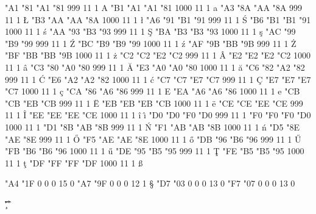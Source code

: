 \setcharcode  "A1  "81  "A1  "81   999  11  1  \texaccent \og A
\setcharcode  "B1  "A1  "A1  "81  1000  11  1  \texaccent \og a
\setcharcode  "A3  "8A  "AA  "8A   999  11  1  \texmacro  \L
\setcharcode  "B3  "AA  "AA  "8A  1000  11  1  \texmacro  \l
\setcharcode  "A6  "91  "B1  "91   999  11  1  \texaccent \'S
\setcharcode  "B6  "B1  "B1  "91  1000  11  1  \texaccent \'s
\setcharcode  "AA  "93  "B3  "93   999  11  1  \texaccent \c S
\setcharcode  "BA  "B3  "B3  "93  1000  11  1  \texaccent \c s
\setcharcode  "AC  "99  "B9  "99   999  11  1  \texaccent \'Z
\setcharcode  "BC  "B9  "B9  "99  1000  11  1  \texaccent \'z
\setcharcode  "AF  "9B  "BB  "9B   999  11  1  \texaccent \.Z
\setcharcode  "BF  "BB  "BB  "9B  1000  11  1  \texaccent \.z
\setcharcode  "C2  "C2  "E2  "C2   999  11  1  \texaccent \^A
\setcharcode  "E2  "E2  "E2  "C2  1000  11  1  \texaccent \^a
\setcharcode  "C3  "80  "A0  "80   999  11  1  \texaccent \u A
\setcharcode  "E3  "A0  "A0  "80  1000  11  1  \texaccent \u a
\setcharcode  "C6  "82  "A2  "82   999  11  1  \texaccent \'C
\setcharcode  "E6  "A2  "A2  "82  1000  11  1  \texaccent \'c
\setcharcode  "C7  "C7  "E7  "C7   999  11  1  \texaccent \c C
\setcharcode  "E7  "E7  "E7  "C7  1000  11  1  \texaccent \c c
\setcharcode  "CA  "86  "A6  "86   999  11  1  \texaccent \og E
\setcharcode  "EA  "A6  "A6  "86  1000  11  1  \texaccent \og e
\setcharcode  "CB  "CB  "EB  "CB   999  11  1  \texaccent \"E
\setcharcode  "EB  "EB  "EB  "CB  1000  11  1  \texaccent \"e
\setcharcode  "CE  "CE  "EE  "CE   999  11  1  \texaccent \^I
\setcharcode  "EE  "EE  "EE  "CE  1000  11  1  \texaccent \^i  \texaccent \^\i
\setcharcode  "D0  "D0  "F0  "D0   999  11  1  \texmacro \Dslash
\setcharcode  "F0  "F0  "F0  "D0  1000  11  1  \texmacro \dslash
\setcharcode  "D1  "8B  "AB  "8B   999  11  1  \texaccent \'N
\setcharcode  "F1  "AB  "AB  "8B  1000  11  1  \texaccent \'n
\setcharcode  "D5  "8E  "AE  "8E   999  11  1  \texaccent \H O
\setcharcode  "F5  "AE  "AE  "8E  1000  11  1  \texaccent \H o
\setcharcode  "DB  "96  "B6  "96   999  11  1  \texaccent \H U
\setcharcode  "FB  "B6  "B6  "96  1000  11  1  \texaccent \H u
\setcharcode  "DE  "95  "B5  "95   999  11  1  \texaccent \c T
\setcharcode  "FE  "B5  "B5  "95  1000  11  1  \texaccent \c t
\setcharcode  "DF  "FF  "FF  "DF  1000  11  1  \texmacro  \ss


\setcharcode  "A4  "1F    0    0     0  15  0  %
\setcharcode  "A7  "9F    0    0     0  12  1  \texmacro \S
\setcharcode  "D7  "03    0    0     0  13  0  \expandto {$\times$}
\setcharcode  "F7  "07    0    0     0  13  0  \expandto {$\div$}

\redefaccent \'
\redefaccent \v 
\redefaccent \" 
\redefaccent \.
\redefaccent \c 
\redefaccent \^ 
\redefaccent \r 
\redefaccent \H
\redefaccent \og

